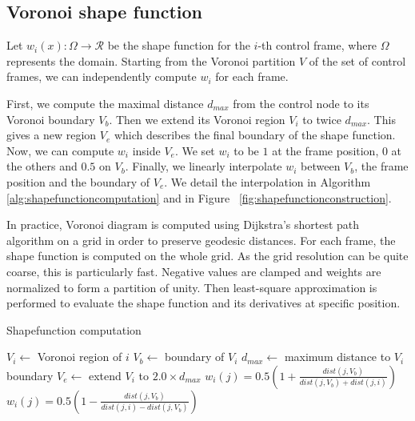 \subsection{Voronoi shape function}

Let $w_{i}(x) : \Omega \rightarrow \mathcal{R}$ be the shape function for the $i$-th control frame, where $\Omega$ represents the domain. Starting from the Voronoi partition $V$ of the set of control frames, we can independently compute $w_{i}$ for each frame.

First, we compute the maximal distance $d_{max}$ from the control node to its Voronoi boundary $V_{b}$. Then we extend its Voronoi region $V_{i}$ to twice $d_{max}$. This gives a new region $V_{e}$ which describes the final boundary of the shape function. Now, we can compute $w_{i}$ inside $V_{e}$. We set $w_{i}$ to be $1$ at the frame position, $0$ at the others and $0.5$ on $V_{b}$. Finally, we linearly interpolate $w_{i}$ between $V_{b}$, the frame position and the boundary of $V_{e}$. We detail the interpolation in Algorithm~ \ref{alg:shapefunctioncomputation} and in Figure~ \ref{fig:shapefunctionconstruction}.

In practice, Voronoi diagram is computed using Dijkstra's shortest path algorithm on a grid in order to preserve geodesic distances. For each frame, the shape function is computed on the whole grid. As the grid resolution can be quite coarse, this is particularly fast. Negative values are clamped and weights are normalized to form a partition of unity. Then least-square approximation is performed to evaluate the shape function and its derivatives at specific position.

\begin{algorithm}[h]
\caption[Frame-based cutting: Shapefunction computation]{\label{alg:shapefunctioncomputation}Shapefunction computation}
\begin{algorithmic}[1]
	\State $V_{i} \gets$ Voronoi region of $i$
	\State $V_{b} \gets$ boundary of $V_{i}$	
	\State $d_{max} \gets$ maximum distance to $V_{i}$ boundary
	\State $V_{e} \gets$ extend $V_{i}$ to $2.0 \times d_{max}$
	\State $\displaystyle w_{i}(j) = 0.5\left(1 + \frac{dist(j,V_{b})}{dist(j,V_{b})+dist(j,i)}\right)$
		\State $\displaystyle w_{i}(j) = 0.5\left(1 - \frac{dist(j,V_{b})}{dist(j,i)-dist(j,V_{b})}\right)$
	\EndIf
	\EndFor
\EndFor
\EndProcedure
\end{algorithmic}
\end{algorithm}

